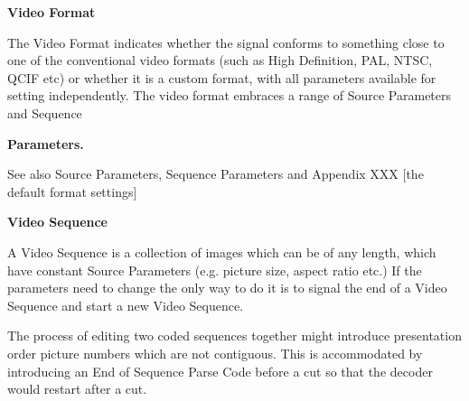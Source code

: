 \textbf{Video Format}

The Video Format indicates whether the signal conforms to something
close to one of the conventional video formats (such as High Definition,
PAL, NTSC, QCIF etc) or whether it is a custom format, with all
parameters available for setting independently. The video format
embraces a range of Source Parameters and Sequence

\textbf{Parameters.}

See also Source Parameters, Sequence Parameters and Appendix XXX [the
default format settings]

\textbf{Video Sequence}

A Video Sequence is a collection of images which can be of any length,
which have constant Source Parameters (e.g. picture size, aspect ratio
etc.) If the parameters need to change the only way to do it is to
signal the end of a Video Sequence and start a new Video Sequence.

The process of editing two coded sequences together might introduce
presentation order picture numbers which are not contiguous. This is
accommodated by introducing an End of Sequence Parse Code before a cut
so that the decoder would restart after a cut.
